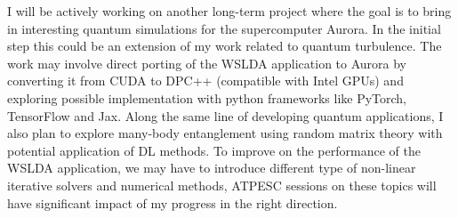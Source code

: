 \documentclass{article}
\begin{document}
I will be actively working on another long-term project where the goal is to 
bring in interesting quantum simulations for the supercomputer Aurora. In the
initial step this could be an extension of my work related to quantum 
turbulence. The work may involve direct porting of the WSLDA
application to Aurora by converting it from CUDA to DPC++ (compatible with 
Intel GPUs) and exploring possible implementation with python frameworks like
PyTorch, TensorFlow and Jax. Along the same line of developing quantum 
applications, I also plan to explore many-body entanglement using random matrix
theory with potential application of DL methods. To improve on the performance
of the WSLDA application, we may have to introduce different type of non-linear
iterative solvers and numerical methods, ATPESC sessions on these topics will
have significant impact of my progress in the right direction.



\end{document}
